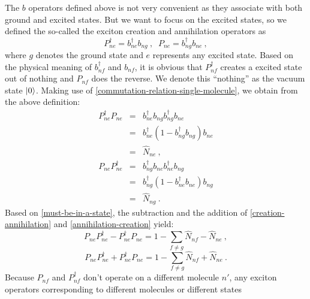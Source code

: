 The $b$ operators defined above is not very convenient as they associate with both ground and excited states. But 
we want to focus on the excited states, so we defined the so-called the exciton creation and annihilation operators
as  
\begin{equation}
P_{ne}^{\dagger} = b_{ne}^{\dagger} b_{ng} \ , \;\;P_{ne}=b_{ng}^{\dagger} b_{ne} \ , \label{creation&annihilation}
\end{equation}
where $g$ denotes the ground state and $e$ represents any excited state. 
Based on the physical meaning of $b_{nf}^{\dagger}$ and $b_{nf}$, it is obvious that $P_{nf}^{\dagger}$ creates a 
excited state out of  nothing and $P_{nf}$ does the reverse. We denote this ``nothing'' as the vacuum state 
$| 0 \rangle$. 
Making use of \autoref{commutation-relation-single-molecule}, we obtain from the above definition:
\begin{eqnarray}
P_{ne}^{\dagger} P_{ne} &=& b_{ne}^{\dagger} b_{ng}b_{ng}^{\dagger} b_{ne} \nonumber \\
                                      &=& b_{ne}^{\dagger}(1-b_{ng}^{\dagger}b_{ng})b_{ne} \nonumber \\
                                      &=& \hat{N}_{ne} \ , \label{creation-annihilation}
\end{eqnarray}
\begin{eqnarray}
P_{ne} P_{ne}^{\dagger} &=& b_{ng}^{\dagger} b_{ne} b_{ne}^{\dagger} b_{ng} \nonumber \\
                                      &=& b_{ng}^{\dagger}(1-b_{ne}^{\dagger}b_{ne})b_{ng} \nonumber \\
                                      &=& \hat{N}_{ng} \ . \label{annihilation-creation}
\end{eqnarray}
Based on \autoref{must-be-in-a-state}, the subtraction and the addition of \autoref{creation-annihilation} and \autoref{annihilation-creation} yield:
\begin{equation}
P_{ne} P_{ne}^{\dagger} - P_{ne}^{\dagger} P_{ne} = 1 - \sum_{f\neq g} \hat{N}_{nf}  -\hat{N}_{ne}\ , \label{exact-relation}
\end{equation}
\begin{equation}
P_{ne} P_{ne}^{\dagger} + P_{ne}^{\dagger} P_{ne} = 1  - \sum_{f\neq g} \hat{N}_{nf}  + \hat{N}_{ne} \ . \label{eqn:addition}
\end{equation}
Because $P_{nf}$ and $P_{nf}^{\dagger}$ don't operate on a different
molecule $n'$, any exciton operators corresponding to different molecules or different states
